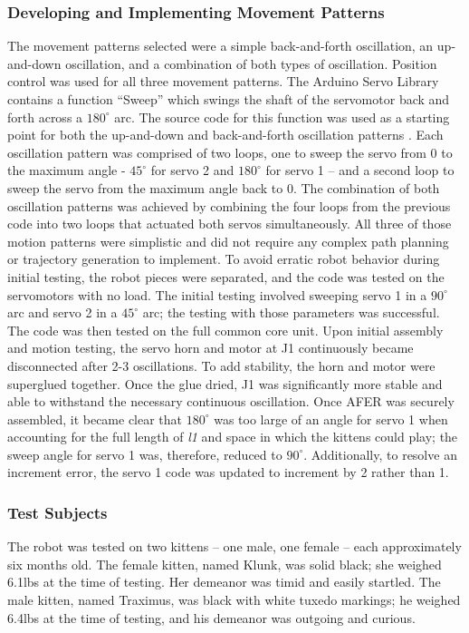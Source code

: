 \subsubsection{Developing and Implementing Movement Patterns}
The movement patterns selected were a simple back-and-forth oscillation, an up-and-down oscillation, and a combination of both types of oscillation. Position control was used for all three movement patterns. 
The Arduino Servo Library contains a function “Sweep” which swings the shaft of the servomotor back and forth across a $180^{\circ}$ arc. The source code for this function was used as a starting point for both the up-and-down and back-and-forth oscillation patterns \cite{Arduino2020sweep}. Each oscillation pattern was comprised of two loops, one to sweep the servo from 0 to the maximum angle - $45^{\circ}$ for servo 2 and $180^{\circ}$ for servo 1 – and a second loop to sweep the servo from the maximum angle back to 0. The combination of both oscillation patterns was achieved by combining the four loops from the previous code into two loops that actuated both servos simultaneously.
All three of those motion patterns were simplistic and did not require any complex path planning or trajectory generation to implement. To avoid erratic robot behavior during initial testing, the robot pieces were separated, and the code was tested on the servomotors with no load. The initial testing involved sweeping servo 1 in a $90^{\circ}$ arc and servo 2 in a $45^{\circ}$ arc; the testing with those parameters was successful.
The code was then tested on the full common core unit. Upon initial assembly and motion testing, the servo horn and motor at J1 continuously became disconnected after 2-3 oscillations. To add stability, the horn and motor were superglued together. Once the glue dried, J1 was significantly more stable and able to withstand the necessary continuous oscillation. 
Once AFER was securely assembled, it became clear that $180^{\circ}$ was too large of an angle for servo 1 when accounting for the full length of \textit{l1} and space in which the kittens could play; the sweep angle for servo 1 was, therefore, reduced to $90^{\circ}$. Additionally, to resolve an increment error, the servo 1 code was updated to increment by 2 rather than 1. 

\subsubsection{Test Subjects}
The robot was tested on two kittens – one male, one female – each approximately six months old. The female kitten, named Klunk, was solid black; she weighed 6.1lbs at the time of testing. Her demeanor was timid and easily startled. The male kitten, named Traximus, was black with white tuxedo markings; he weighed 6.4lbs at the time of testing, and his demeanor was outgoing and curious.

